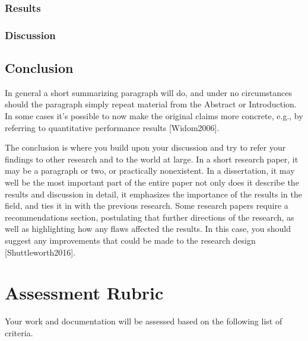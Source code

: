 \documentclass[letterpaper,10pt,english]{sphinxmanual}
\begin{document}
\subsection{Results}
\label{\detokenize{docs/ShavitFrancez/results:results}}

\subsection{Discussion}
\label{\detokenize{docs/ShavitFrancez/results:discussion}}
\sphinxstepscope


\section{Conclusion}
\label{\detokenize{docs/ShavitFrancez/conclusion:conclusion}}\label{\detokenize{docs/ShavitFrancez/conclusion::doc}}
\sphinxAtStartPar
In general a short summarizing paragraph will do, and under no circumstances should the paragraph simply repeat material from the Abstract or Introduction. In some cases it’s possible to now make the original claims more concrete, e.g., by referring to quantitative performance results {[}Widom2006{]}.

\sphinxAtStartPar
The conclusion is where you build upon your discussion and try to refer your findings to other research and to the world at large. In a short research paper, it may be a paragraph or two, or practically non\sphinxhyphen{}existent. In a dissertation, it may well be the most important part of the entire paper \sphinxhyphen{} not only does it describe the results and discussion in detail, it emphasizes the importance of the results in the field, and ties it in with the previous research. Some research papers require a recommendations section, postulating that further directions of the research, as well as highlighting how any flaws affected the results. In this case, you should suggest any improvements that could be made to the research design {[}Shuttleworth2016{]}.

\sphinxstepscope


\chapter{Assessment Rubric}
\label{\detokenize{docs/rubric:assessment-rubric}}\label{\detokenize{docs/rubric::doc}}
\sphinxAtStartPar
Your work and documentation will be assessed based on the following list of criteria.
\end{document}
